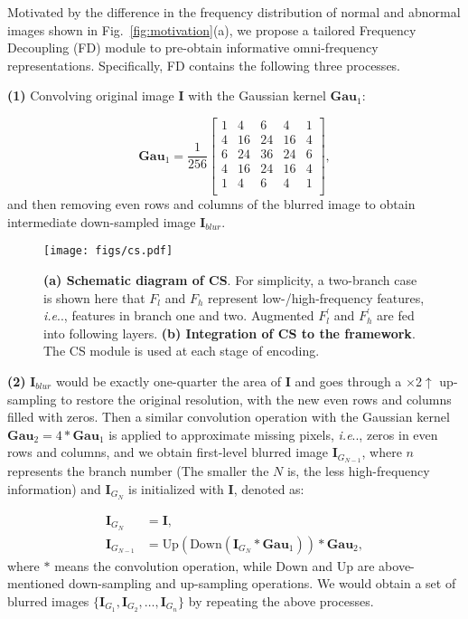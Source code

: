 \documentclass[lettersize,journal]{IEEEtran}
\makeatletter
\DeclareRobustCommand\onedot{\futurelet\@let@token\@onedot}
\def\@onedot{\ifx\@let@token.\else.\null\fi\xspace}
\def\ie{\emph{i.e}\onedot} \def\Ie{\emph{I.e}\onedot}
\makeatother
\begin{document}
Motivated by the difference in the frequency distribution of normal and abnormal images shown in Fig.~\ref{fig:motivation}(a), we propose a tailored Frequency Decoupling (FD) module to pre-obtain informative omni-frequency representations. Specifically, FD contains the following three processes. 

\noindent\textbf{(1)} Convolving original image $\bm{I}$ with the Gaussian kernel $\bm{Gau}_1$:

\begin{equation}
    \bm{Gau}_1 = \frac{1}{256}\left[\begin{array}{ccccc}
    1&4&6&4&1\\
    4&16&24&16&4\\
    6&24&36&24&6\\
    4&16&24&16&4\\
    1&4&6&4&1\\
    \end{array}\right],
\end{equation}
and then removing even rows and columns of the blurred image to obtain intermediate down-sampled image $\bm{I}_{blur}$.
\begin{figure*}[t]
    \centering
    \texttt{[image: figs/cs.pdf]}
    \caption{\textbf{(a) Schematic diagram of CS}. For simplicity, a two-branch case is shown here that $F_l$ and $F_h$ represent low-/high-frequency features, \ie, features in branch one and two. Augmented $F_{l}^{'}$ and $F_{h}^{'}$ are fed into following layers. \textbf{(b) Integration of CS to the framework}. The CS module is used at each stage of encoding.}
    \label{fig:atten}
\end{figure*}

\noindent\textbf{(2)} $\bm{I}_{blur}$ would be exactly one-quarter the area of $\bm{I}$ and goes through a $\times$2$\uparrow$ up-sampling to restore the original resolution, with the new even rows and columns filled with zeros. Then a similar convolution operation with the Gaussian kernel $\bm{Gau}_2 = 4 * \bm{Gau}_1$ is applied to approximate missing pixels, \ie, zeros in even rows and columns, and we obtain first-level blurred image $\bm{I}_{G_{N-1}}$, where $n$ represents the branch number (The smaller the $N$ is, the less high-frequency information) and $\bm{I}_{G_{N}}$ is initialized with $\bm{I}$, denoted as:

\begin{equation}
\begin{aligned}
    \bm{I}_{G_{N}}      &= \bm{I},\\
    \bm{I}_{G_{N-1}}    &= \text{Up}(\text{Down}(\bm{I}_{G_{N}} * \bm{Gau}_1)) * \bm{Gau}_2,
\end{aligned}
\end{equation}
where $*$ means the convolution operation, while $\text{Down}$ and $\text{Up}$ are above-mentioned down-sampling and up-sampling operations. We would obtain a set of blurred images $\{\bm{I}_{G_{1}}, \bm{I}_{G_{2}}, \dots, \bm{I}_{G_{n}}\}$ by repeating the above processes. 
\end{document}
